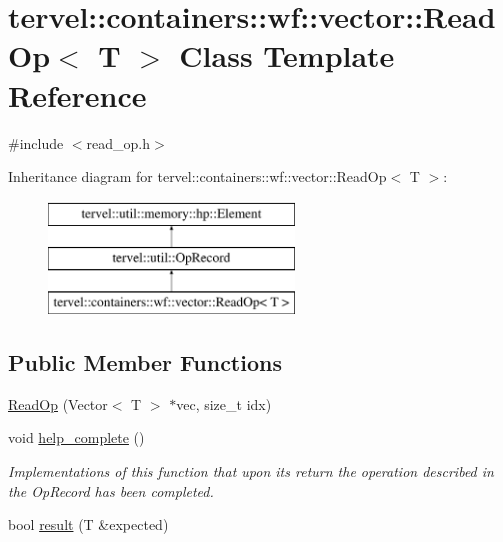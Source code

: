 \hypertarget{classtervel_1_1containers_1_1wf_1_1vector_1_1_read_op}{}\section{tervel\+:\+:containers\+:\+:wf\+:\+:vector\+:\+:Read\+Op$<$ T $>$ Class Template Reference}
\label{classtervel_1_1containers_1_1wf_1_1vector_1_1_read_op}


{\ttfamily \#include $<$read\+\_\+op.\+h$>$}

Inheritance diagram for tervel\+:\+:containers\+:\+:wf\+:\+:vector\+:\+:Read\+Op$<$ T $>$\+:\begin{figure}[H]
\begin{center}
\leavevmode
\includegraphics[height=3.000000cm]{classtervel_1_1containers_1_1wf_1_1vector_1_1_read_op}
\end{center}
\end{figure}
\subsection*{Public Member Functions}
\begin{DoxyCompactItemize}
\item 
\hyperlink{classtervel_1_1containers_1_1wf_1_1vector_1_1_read_op_ad0c7ce2b9563e63413925ae67a2cc0cc}{Read\+Op} (Vector$<$ T $>$ $\ast$vec, size\+\_\+t idx)
\item 
void \hyperlink{classtervel_1_1containers_1_1wf_1_1vector_1_1_read_op_ad2c5f63b0c39e1b30350656fcdd44538}{help\+\_\+complete} ()
\begin{DoxyCompactList}\small\item\em Implementations of this function that upon its return the operation described in the Op\+Record has been completed. \end{DoxyCompactList}\item 
bool \hyperlink{classtervel_1_1containers_1_1wf_1_1vector_1_1_read_op_af4e89911f2abe9ec130f5e03b1c98a50}{result} (T \&expected)
\end{DoxyCompactItemize}
